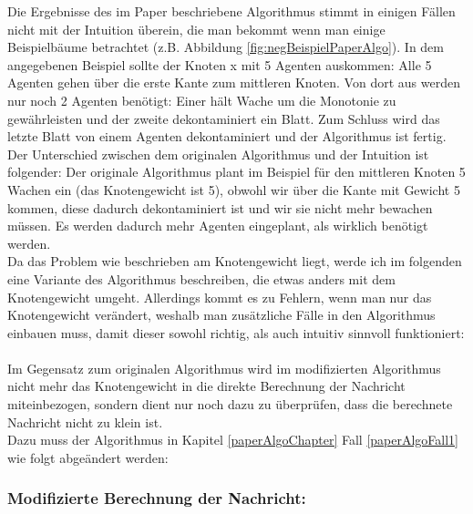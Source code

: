 Die Ergebnisse des im Paper beschriebene Algorithmus stimmt in einigen Fällen nicht mit der Intuition überein, die man bekommt wenn man einige Beispielbäume betrachtet (z.B. Abbildung \ref{fig:negBeispielPaperAlgo}). In dem  angegebenen Beispiel sollte der Knoten x mit 5 Agenten auskommen: Alle 5 Agenten gehen über die erste Kante zum mittleren Knoten. Von dort aus werden nur noch 2 Agenten benötigt: Einer hält Wache um die Monotonie zu gewährleisten und der zweite dekontaminiert ein Blatt. Zum Schluss wird das letzte Blatt von einem Agenten dekontaminiert und der Algorithmus ist fertig.
\\
Der Unterschied zwischen dem originalen Algorithmus und der Intuition ist folgender: Der originale Algorithmus plant im Beispiel für den mittleren Knoten 5 Wachen ein (das Knotengewicht ist 5), obwohl wir über die Kante mit Gewicht 5 kommen, diese dadurch dekontaminiert ist und wir sie nicht mehr bewachen müssen. Es werden dadurch mehr Agenten eingeplant, als wirklich benötigt werden.
\\
Da das Problem wie beschrieben am Knotengewicht liegt, werde ich im folgenden eine Variante des Algorithmus beschreiben, die etwas anders mit dem Knotengewicht umgeht. Allerdings kommt es zu Fehlern, wenn man nur das Knotengewicht verändert, weshalb man zusätzliche Fälle in den Algorithmus einbauen muss, damit dieser sowohl richtig, als auch intuitiv sinnvoll funktioniert:
\\
\\
Im Gegensatz zum originalen Algorithmus wird im modifizierten Algorithmus nicht mehr das Knotengewicht in die direkte Berechnung der Nachricht miteinbezogen, sondern dient nur noch dazu zu überprüfen, dass die berechnete Nachricht nicht zu klein ist.
\\
Dazu muss der Algorithmus in Kapitel \ref{paperAlgoChapter} Fall \ref{paperAlgoFall1} wie folgt abgeändert werden:

\subsubsection*{Modifizierte Berechnung der Nachricht:}

